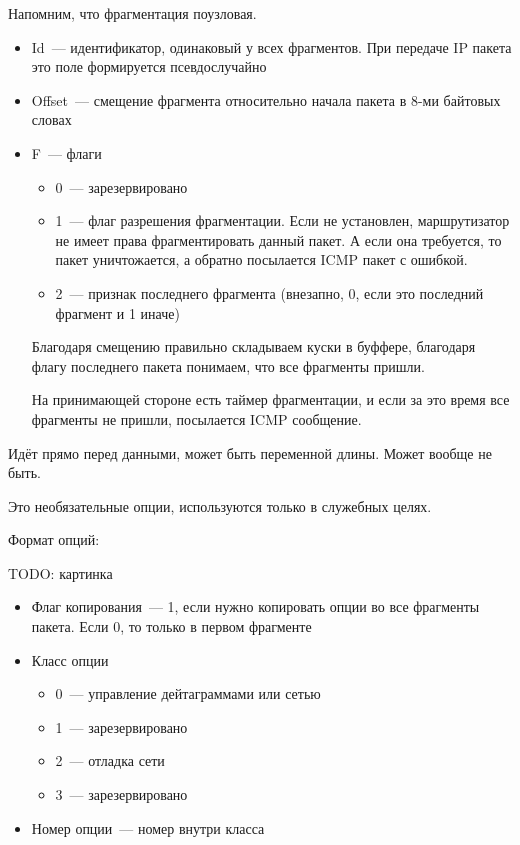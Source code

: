
Напомним, что фрагментация поузловая.

\begin{itemize}
    \item Id~--- идентификатор, одинаковый у всех фрагментов. При передаче IP пакета это поле формируется псевдослучайно
    \item Offset~--- смещение фрагмента относительно начала пакета в 8-ми байтовых словах
    \item F~--- флаги
    \begin{itemize}
        \item 0~--- зарезервировано
        \item 1~--- флаг разрешения фрагментации. Если не установлен, маршрутизатор не имеет права фрагментировать данный пакет. А если она требуется, то пакет уничтожается, а обратно посылается ICMP пакет с ошибкой.
        \item 2~--- признак последнего фрагмента (внезапно, 0, если это последний фрагмент и 1 иначе)
    \end{itemize}

    Благодаря смещению правильно складываем куски в буффере, благодаря флагу последнего пакета понимаем, что все фрагменты пришли.

    На принимающей стороне есть таймер фрагментации, и если за это время все фрагменты не пришли, посылается ICMP сообщение.
\end{itemize}


Идёт прямо перед данными, может быть переменной длины. Может вообще не быть.

Это необязательные опции, используются только в служебных целях.

Формат опций:

TODO: картинка

\begin{itemize}
    \item Флаг копирования~--- 1, если нужно копировать опции во все фрагменты пакета. Если 0, то только в первом фрагменте
    \item Класс опции
    \begin{itemize}
        \item 0~--- управление дейтаграммами или сетью
        \item 1~--- зарезервировано
        \item 2~--- отладка сети
        \item 3~--- зарезервировано
    \end{itemize}
    \item Номер опции~--- номер внутри класса
\end{itemize}

